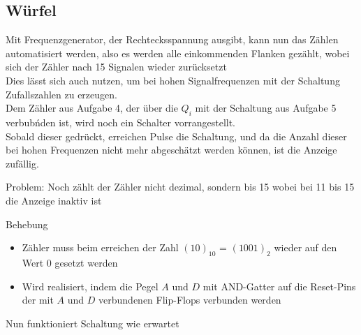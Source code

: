 \documentclass[compress,11pt]{beamer}
\begin{document}
\subsection{Würfel}
\begin{frame}
Mit Frequenzgenerator, der Rechtecksspannung ausgibt, kann nun das Zählen automatisiert werden, also es werden alle einkommenden Flanken gezählt, wobei sich der Zähler nach 15 Signalen wieder zurücksetzt\\
Dies lässt sich auch nutzen, um bei hohen Signalfrequenzen mit der Schaltung Zufallszahlen zu erzeugen.\\
Dem Zähler aus Aufgabe 4, der über die $Q_i$ mit der Schaltung aus Aufgabe 5 verbubńden ist, wird noch ein Schalter vorrangestellt.\\
Sobald dieser gedrückt, erreichen Pulse die Schaltung, und da die Anzahl dieser bei hohen Frequenzen nicht mehr abgeschätzt werden können, ist die Anzeige zufällig.
\end{frame}
\begin{frame}
Problem: Noch zählt der Zähler nicht dezimal, sondern bis 15 wobei bei 11 bis 15 die Anzeige inaktiv ist 
\begin{block}{Behebung}
\begin{itemize}
\item Zähler muss beim erreichen der Zahl $(10)_{10}$ = $(1001)_2$ wieder auf den Wert 0 gesetzt werden
\item Wird realisiert, indem die Pegel $A$ und $D$ mit AND-Gatter auf die Reset-Pins der mit $A$ und $D$ verbundenen Flip-Flops verbunden werden 
\end{itemize}
\end{block}
Nun funktioniert Schaltung wie erwartet
\end{frame}
\end{document}
